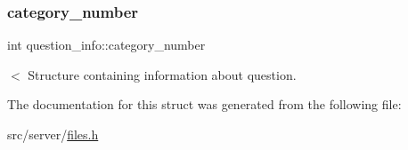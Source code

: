 \subsubsection{\texorpdfstring{category\+\_\+number}{category\_number}}
{\footnotesize\ttfamily int question\+\_\+info\+::category\+\_\+number}

$<$ Structure containing information about question. 

The documentation for this struct was generated from the following file\+:\begin{DoxyCompactItemize}
\item 
src/server/\mbox{\hyperlink{files_8h}{files.\+h}}\end{DoxyCompactItemize}
